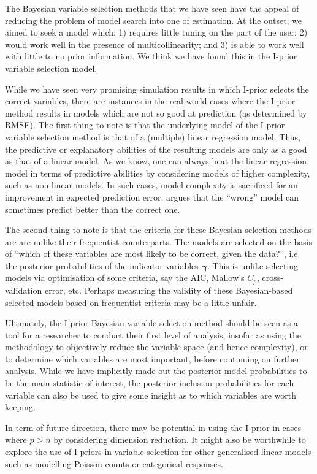 



The Bayesian variable selection methods that we have seen have the appeal of reducing the problem of model search into one of estimation. At the outset, we aimed to seek a model which: 1) requires little tuning on the part of the user; 2) would work well in the presence of multicollinearity; and 3) is able to work well with little to no prior information. We think we have found this in the I-prior variable selection model.

While we have seen very promising simulation results in which I-prior selects the correct variables, there are instances in the real-world cases where the I-prior method results in models which are not so good at prediction (as determined by RMSE). The first thing to note is that the underlying model of the I-prior variable selection method is that of a (multiple) linear regression model. Thus, the predictive or explanatory abilities of the resulting models are only as a good as that of a linear model. As we know, one can always beat the linear regression model in terms of predictive abilities by considering models of higher complexity, such as non-linear models. In such cases, model complexity is sacrificed for an improvement in expected prediction error. \cite{Shmueli2010} argues that the ``wrong'' model can sometimes predict better than the correct one.

The second thing to note is that the criteria for these Bayesian selection methods are are unlike their frequentist counterparts. The models are selected on the basis of ``which of these variables are most likely to be correct, given the data?'', i.e. the posterior probabilities of the indicator variables $\boldsymbol{\gamma}$. This is unlike selecting models via optimisation of some criteria, say the AIC, Mallow's $C_p$, cross-validation error, etc. Perhaps measuring the validity of these Bayesian-based selected models based on frequentist criteria may be a little unfair.

Ultimately, the I-prior Bayesian variable selection method should be seen as a tool for a researcher to conduct their first level of analysis, insofar as using the methodology to objectively reduce the variable space (and hence complexity), or to determine which variables are most important, before continuing on further analysis. While we have implicitly made out the posterior model probabilities to be the main statistic of interest, the posterior inclusion probabilities for each variable can also be used to give some insight as to which variables are worth keeping.

In term of future direction, there may be potential in using the I-prior in cases where $p > n$ by considering dimension reduction. It might also be worthwhile to explore the use of I-priors in variable selection for other generalised linear models such as modelling Poisson counts or categorical responses.

